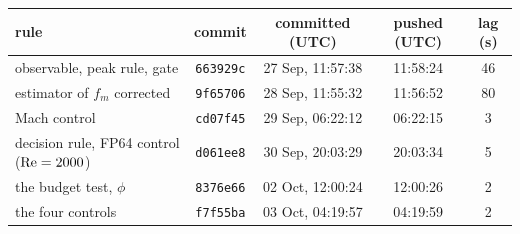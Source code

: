 \begin{tabular}{lcccc}
rule & commit & committed (UTC) & pushed (UTC) & lag (s) \\
\hline
observable, peak rule, gate & \texttt{663929c} & 27 Sep, 11:57:38 & 11:58:24 & 46 \\
estimator of $f_m$ corrected & \texttt{9f65706} & 28 Sep, 11:55:32 & 11:56:52 & 80 \\
Mach control & \texttt{cd07f45} & 29 Sep, 06:22:12 & 06:22:15 & 3 \\
decision rule, FP64 control ($\mathrm{Re}=2000$) & \texttt{d061ee8} & 30 Sep, 20:03:29 & 20:03:34 & 5 \\
the budget test, $\phi$ & \texttt{8376e66} & 02 Oct, 12:00:24 & 12:00:26 & 2 \\
the four controls & \texttt{f7f55ba} & 03 Oct, 04:19:57 & 04:19:59 & 2 \\
\end{tabular}
